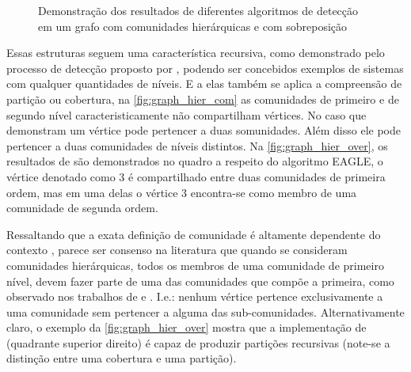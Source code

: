 \documentclass[notes.tex]{subfiles}
\begin{document}
\begin{figure}[htpb]
    \centering
    \caption{Demonstração dos resultados de diferentes algoritmos de detecção em um grafo com comunidades hierárquicas e com sobreposição}\label{fig:graph_hier_over}
\end{figure}

Essas estruturas seguem uma característica recursiva, como demonstrado pelo processo de detecção proposto por , podendo ser concebidos exemplos de sistemas com qualquer quantidades de níveis.
E a elas também se aplica a compreensão de partição ou cobertura, na \autoref{fig:graph_hier_com} as comunidades de primeiro e de segundo nível caracteristicamente não compartilham vértices.
No caso que demonstram  um vértice pode pertencer a duas somunidades.
Além disso ele pode pertencer a duas comunidades de níveis distintos.
Na \autoref{fig:graph_hier_over}, os resultados de  são demonstrados no quadro a respeito do algoritmo EAGLE, o vértice denotado como 3 é compartilhado entre duas comunidades de primeira ordem, mas em uma delas o vértice 3 encontra-se como membro de uma comunidade de segunda ordem.

Ressaltando que a exata definição de comunidade é altamente dependente do contexto \cite{fortunato2010community}, parece ser consenso na literatura que quando se consideram comunidades hierárquicas, todos os membros de uma comunidade de primeiro nível, devem fazer parte de uma das comunidades que compõe a primeira, como observado nos trabalhos de  e .
I.e.: nenhum vértice pertence exclusivamente a uma comunidade sem pertencer a alguma das sub-comunidades.
Alternativamente claro, o exemplo da \autoref{fig:graph_hier_over} mostra que a implementação de  (quadrante superior direito) é capaz de produzir partições recursivas (note-se a distinção entre uma cobertura e uma partição).
\end{document}
